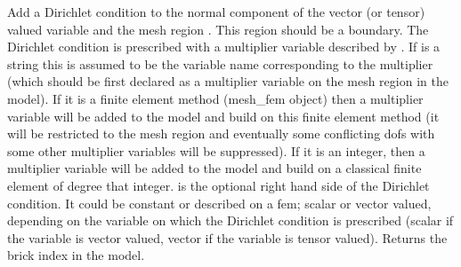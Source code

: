 \documentclass[a4paper,11pt,english]{sphinxmanual}
\begin{document}
\begin{fulllineitems}
\begin{fulllineitems}
\label{\detokenize{python/cmdref_Model:getfem.Model.add_normal_Dirichlet_condition_with_multipliers}}
Add a Dirichlet condition to the normal component of the vector
(or tensor) valued variable  and the mesh
region . This region should be a boundary. The Dirichlet
condition is prescribed with a multiplier variable described by
. If  is a string this is assumed
to be the variable name corresponding to the multiplier (which should be
first declared as a multiplier variable on the mesh region in the model).
If it is a finite element method (mesh\_fem object) then a multiplier
variable will be added to the model and build on this finite element
method (it will be restricted to the mesh region  and eventually
some conflicting dofs with some other multiplier variables will be
suppressed). If it is an integer, then a  multiplier variable will be
added to the model and build on a classical finite element of degree
that integer.  is the optional right hand side of  the
Dirichlet condition. It could be constant or described on a fem; scalar
or vector valued, depending on the variable on which the Dirichlet
condition is prescribed (scalar if the variable
is vector valued, vector if the variable is tensor valued).
Returns the brick index in the model.

\end{fulllineitems}



\end{fulllineitems}
\end{document}
